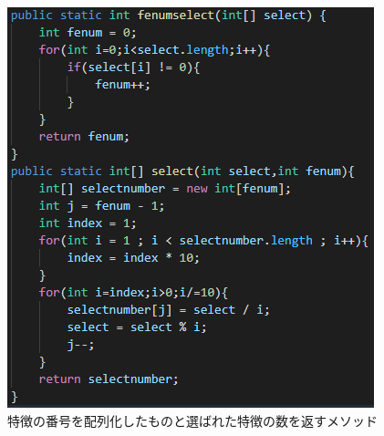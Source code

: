 \begin{itemize}
\begin{figure}[htbp]
\begin{minipage}[t]{0.45\hsize}
      \label{graph:27}
    \end{minipage}
    \begin{minipage}[t]{0.45\hsize}
      \includegraphics[scale=0.5]{その他6.PNG}
      \centering
      \caption{特徴の番号を配列化したものと選ばれた特徴の数を返すメソッド}
      \label{graph:28}
    \end{minipage}
  \end{figure}
\end{itemize}
\clearpage

